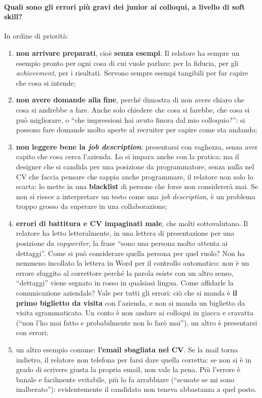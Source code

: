 \paragraph{Quali sono gli errori più gravi dei junior ai colloqui, a livello di soft skill?} In ordine di priorità:
\begin{enumerate}
  \item \textbf{non arrivare preparati}, cioè \textbf{senza esempi}. Il relatore ha sempre un esempio pronto per ogni
        cosa di cui vuole parlare: per la fiducia, per gli \emph{achievement}, per i risultati. Servono sempre esempi
        tangibili per far capire che cosa si intende;
  \item \textbf{non avere domande alla fine}, perché dimostra di non avere chiaro che cosa si andrebbe a fare. Anche solo
        chiedere che cosa si farebbe, che cosa si può migliorare, o ``che impressioni hai avuto finora dal mio
        colloquio?'': si possono fare domande molto aperte al recruiter per capire come sta andando;
  \item \textbf{non leggere bene la \emph{job description}}: presentarsi con vaghezza, senza aver capito che cosa cerca
        l'azienda. Lo si impara anche con la pratica; ma il designer che si candida per una posizione da programmatore,
        senza nulla nel CV che faccia pensare che sappia anche programmare, il relatore non solo lo scarta: lo mette in
        una \textbf{blacklist} di persone che forse non considererà mai. Se non si riesce a interpretare un testo come una
        \emph{job description}, è un problema troppo grosso da superare in una collaborazione;
  \item \textbf{errori di battitura e CV impaginati male}, che molti sottovalutano. Il relatore ha letto letteralmente,
        in una lettera di presentazione per una posizione da \emph{copywriter}, la frase ``sono una persona molto attenta
        ai dettaggi''. Come si può considerare quella persona per quel ruolo? Non ha nemmeno incollato la lettera in Word
        per il controllo automatico: non è un errore sfuggito al correttore perché la parola esiste con un altro senso,
        ``dettaggi'' viene segnato in rosso in qualsiasi lingua. Come affidarle la comunicazione aziendale? Vale per tutti
        gli errori: ciò che si manda è \textbf{il primo biglietto da visita} con l'azienda, e non si manda un biglietto da
        visita sgrammaticato. Un conto è non andare ai colloqui in giacca e cravatta (``non l'ho mai fatto e probabilmente
        non lo farò mai''), un altro è presentarsi con errori;
  \item un altro esempio comune: \textbf{l'email sbagliata nel CV}. Se la mail torna indietro, il relatore non telefona
        per farsi dare quella corretta: se non si è in grado di scrivere giusta la propria email, non vale la pena. Più
        l'errore è banale e facilmente evitabile, più lo fa arrabbiare (``scusate se mi sono inalberato''): evidentemente
        il candidato non teneva abbastanza a quel posto.
\end{enumerate}

